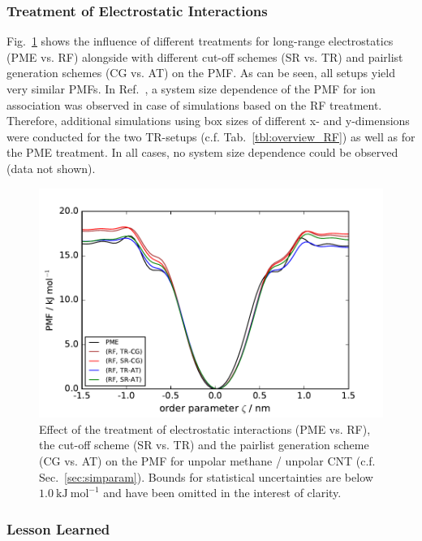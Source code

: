 \documentclass[9pt,lessons,pubversion]{livecoms}
\begin{document}
\subsubsection*{Treatment of Electrostatic Interactions}

Fig.~\ref{fig:UU_Meth_CNT_electrst} shows the influence of different treatments for long-range electrostatics (PME vs. RF) alongside with different cut-off schemes (SR vs. TR) and pairlist generation schemes 
(CG vs. AT) on the PMF. As can be seen, all setups yield very similar PMFs. 
In Ref.~, a system size dependence of the PMF for ion association was observed in case of simulations based on the RF treatment. 
Therefore, additional simulations using box sizes of different x- and y-dimensions were conducted for the two TR-setups (c.f. Tab.~\ref{tbl:overview_RF}) as well as for the PME treatment. 
In all cases, no system size dependence could be observed  (data not shown).

\begin{figure}[htb!]
\includegraphics[width=\linewidth]{figures/pmf_uCNT_uMeth_electrostatics.pdf}
\caption{Effect of the treatment of electrostatic interactions (PME vs. RF), the cut-off scheme (SR vs. TR) and the pairlist generation scheme (CG vs. AT)  on the PMF for unpolar methane / unpolar CNT 
(c.f. Sec.~\ref{sec:simparam}).
Bounds for statistical uncertainties are below $1.0~\mathrm{kJ}~\mathrm{mol}^{-1}$ and have been omitted in the interest of clarity.
}
\label{fig:UU_Meth_CNT_electrst}
\end{figure}

\subsubsection*{Lesson Learned}
\end{document}

